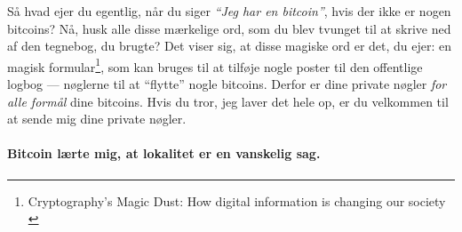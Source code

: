 Så hvad ejer du egentlig, når du siger \textit{\enquote{Jeg har en bitcoin}}, 
hvis der ikke er nogen bitcoins? Nå, husk alle disse mærkelige ord, som du blev 
tvunget til at skrive ned af den tegnebog, du brugte? Det viser sig, at disse 
magiske ord er det, du ejer: en magisk formular\footnote{Cryptography's Magic 
Dust: How digital information is changing our society \cite{gigi:magic-spell}}, 
som kan bruges til at tilføje nogle poster til den offentlige logbog --- 
nøglerne til at \enquote{flytte} nogle bitcoins. Derfor er dine private nøgler 
\textit{for alle formål} dine bitcoins. Hvis du tror, jeg laver det hele op, er 
du velkommen til at sende mig dine private nøgler.

\paragraph{Bitcoin lærte mig, at lokalitet er en vanskelig sag.}

%
%
%
%
%
%
%
